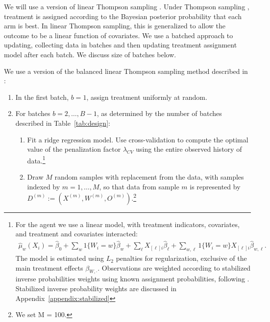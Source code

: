 \documentclass[letterpaper, 12pt, parskip=full,DIV=12]{scrartcl}
\begin{document}
We will use a version of linear Thompson sampling \citep{agrawal2013thompson}. Under Thompson sampling \citep{thompson1933likelihood,thompson1935theory}, treatment is assigned according to the Bayesian posterior probability that each arm is best. In linear Thompson sampling, this is generalized to allow the outcome to be a linear function of covariates. We use a batched approach to updating, collecting data in batches and then updating treatment assignment model after each batch. We discuss size of batches below. 

We use a version of the balanced linear Thompson sampling method described in \cite{dimakopoulou2017estimation, dimakopoulou2019balanced} :

\begin{enumerate}
\item In the first batch, $b = 1$, assign treatment uniformly at random. 


\item For batches $b = 2, \dots, B-1$, as determined by the number of batches described in Table~\ref{tab:design}:

\begin{enumerate}
	
 \item Fit a ridge regression model. Use cross-validation to compute the optimal value of the penalization factor $\lambda_{CV}$ using the entire observed history of data.\footnote{For the agent we use a linear model, with treatment indicators, covariates, and treatment and covariates interacted:
\begin{align*}
\hat{\mu}_w(X_{i}) = \hat{\beta}_{0} +
			\sum_{w} 1\{W_i = w\}\hat\beta_w  +
			\sum_{\ell}  X_{[\ell]i}\hat{\beta}_{\ell} +
         \sum_{w,\ell} 1\{ W_{i} = w\} X_{[\ell]i} \hat{\beta}_{w, \ell}.
         \label{eq:linear_model_full}
\end{align*} 
The model is estimated using $L_{2}$ penalties for regularization, exclusive of the main treatment effects $\beta_{W,\cdot}$. Observations are weighted according to stabilized inverse probabilities weights using known assignment probabilities, following \cite{dimakopoulou2017estimation}. Stabilized inverse probability weights are discussed in Appendix~\ref{appendix:stabilized}
}

  \item \label{step:draw} Draw $M$ random samples with replacement from the data, with samples indexed by $m = 1, \dots, M$, so that data from sample $m$ is represented by $D^{(m)} := (X^{(m)}, W^{(m)}, O^{(m)})$.\footnote{We set M = 100.} 


\end{enumerate}
\end{enumerate}
\end{document}
